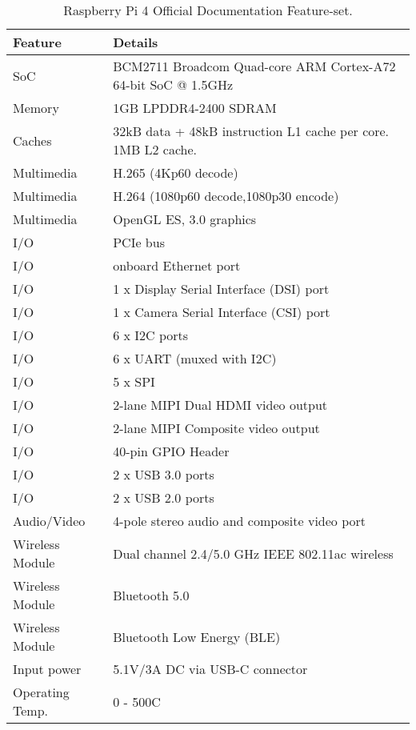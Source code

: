 \documentclass[journal]{IEEEtran}
\begin{document}
    \begin{table}[h!] 
        \begin{center}
          \caption{Raspberry Pi 4 Official Documentation Feature-set.}
          \label{tab:table1}
          \begin{tabular}{l|l} %
            \textbf{Feature} & \textbf{Details}\\
            \hline
            SoC & BCM2711 Broadcom Quad-core ARM Cortex-A72 64-bit SoC @ 1.5GHz\\
            Memory & 1GB LPDDR4-2400 SDRAM \\
            Caches & 32kB data + 48kB instruction L1 cache per core. 1MB L2 cache.\\
            Multimedia & H.265 (4Kp60 decode)\\
            Multimedia & H.264 (1080p60 decode,1080p30 encode)\\
            Multimedia & OpenGL ES, 3.0 graphics\\
            I/O & PCIe bus\\
            I/O & onboard Ethernet port\\
            I/O & 1 x Display Serial Interface (DSI) port\\
            I/O & 1 x Camera Serial Interface (CSI) port\\
            I/O & 6 x I2C ports\\
            I/O & 6 x UART (muxed with I2C)\\
            I/O & 5 x SPI\\
            I/O & 2-lane MIPI Dual HDMI video output\\
            I/O & 2-lane MIPI Composite video output\\
            I/O & 40-pin GPIO Header\\
            I/O & 2 x USB 3.0 ports\\
            I/O & 2 x USB 2.0 ports\\
            Audio/Video & 4-pole stereo audio and composite video port\\
            Wireless Module & Dual channel 2.4/5.0 GHz IEEE 802.11ac wireless\\
            Wireless Module & Bluetooth 5.0\\
            Wireless Module & Bluetooth Low Energy (BLE)\\
            Input power & 5.1V/3A DC via USB-C connector\\
            Operating Temp. & 0 - 500C
          \end{tabular}
        \end{center}
      \end{table}
\end{document}
